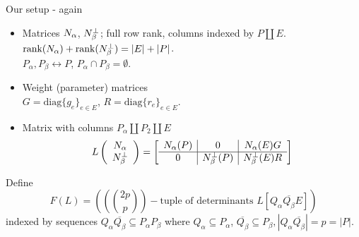 \documentclass{beamer}
\newcommand{\dunion}{\coprod}
\begin{document}
\begin{frame}{Our setup - again}
  \begin{itemize}
  \item
    Matrices $N_{\alpha}$, $N_{\beta}^{\perp}$; full row rank, columns indexed by
    $P\dunion E$. $\text{rank}(N_{\alpha})+\text{rank}(N_{\beta}^{\perp})=|E|+|P|$.\\
    $P_{\alpha},P_{\beta}\leftrightarrow P$, $P_{\alpha}\cap P_{\beta}=\emptyset$.
  \item
    Weight (parameter) matrices\\
    $G=\text{diag}\{g_e\}_{e\in E} $,
    $R=\text{diag}\{r_e\}_{e\in E} $.
  \item
    Matrix with columns $P_\alpha \dunion P_2 \dunion E$
    \[
    L\left( \begin{array}{c} N_{\alpha}\\ N_{\beta}^{\perp} \end{array} \right)
    = \left[\begin{array}{c|c|c} N_{\alpha}(P)  &  0  &  N_{\alpha}(E)G \\  \hline
0  & N_{\beta}^{\perp}(P)  &  N_{\beta}^{\perp}(E)R \end{array}\right]
    \]
  \end{itemize}

  Define
  \[
  F(L)=((\binom{2p}{p})-\text{tuple of determinants\ } L[Q_\alpha\overline{Q_\beta}E])
  \]
  indexed by sequences $Q_\alpha \overline{Q_\beta} \subseteq P_\alpha P_\beta$ where
  $Q_\alpha\subseteq P_\alpha$, $\overline{Q_\beta}\subseteq P_\beta, |Q_\alpha \overline{Q_\beta}|=p=|P|$.
    
\end{frame}
\end{document}
